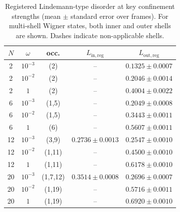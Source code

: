\documentclass[superscriptaddress,unsortedaddress,amsmath,amssymb,aps]{revtex4-2}
\begin{document}
\begin{table}[t]
  \centering
  \caption{Registered Lindemann-type disorder at key confinement strengths (mean $\pm$ standard error over frames).
  For multi-shell Wigner states, both inner and outer shells are shown. Dashes indicate non-applicable shells.}
  \label{tab:lindemann_key}

  \begin{threeparttable}
    \setlength{\tabcolsep}{6.2pt}
    \renewcommand{\arraystretch}{1.12}
    \begin{tabular}{c c c c c}
      \toprule
      $N$ & $\omega$ & occ. & $L_{\mathrm{in,reg}}$ & $L_{\mathrm{out,reg}}$ \\
      \midrule
      2  & $10^{-3}$ & (2)      & --                & $0.1325\pm0.0007$ \\
      2  & $10^{-2}$ & (2)      & --                & $0.2046\pm0.0014$ \\
      2  & $1$       & (2)      & --                & $0.4004\pm0.0022$ \\
      \midrule
      6  & $10^{-3}$ & (1,5)    & --                & $0.2049\pm0.0008$ \\
      6  & $10^{-2}$ & (1,5)    & --                & $0.3443\pm0.0011$ \\
      6  & $1$       & (6)      & --                & $0.5607\pm0.0011$ \\
      \midrule
      12 & $10^{-3}$ & (3,9)    & $0.2736\pm0.0013$ & $0.2547\pm0.0010$ \\
      12 & $10^{-2}$ & (1,11)   & --                & $0.4500\pm0.0010$ \\
      12 & $1$       & (1,11)   & --                & $0.6178\pm0.0010$ \\
      \midrule
      20 & $10^{-3}$ & (1,7,12) & $0.3514\pm0.0008$ & $0.2696\pm0.0007$ \\
      20 & $10^{-2}$ & (1,19)   & --                & $0.5716\pm0.0011$ \\
      20 & $1$       & (1,19)   & --                & $0.6920\pm0.0010$ \\
      \bottomrule
    \end{tabular}
  \end{threeparttable}
\end{table}
\end{document}
